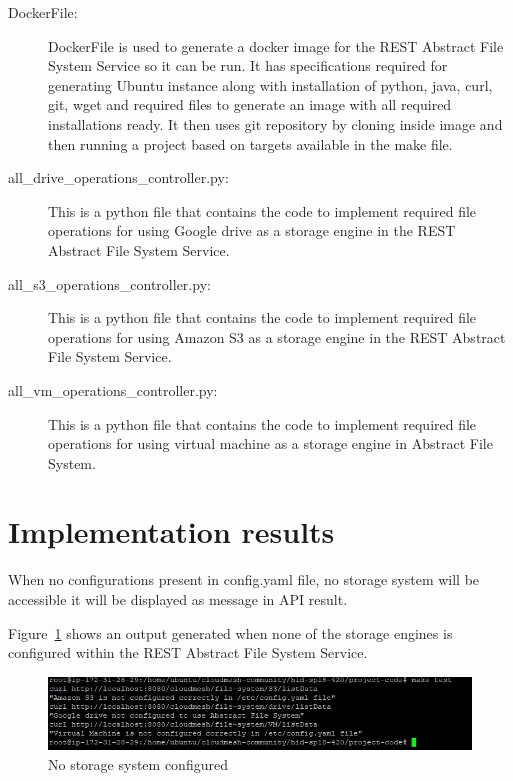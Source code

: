\begin{description}
\item[DockerFile:]


  DockerFile is used to generate a docker image for the REST Abstract
  File System Service so it can be run.  It has specifications required for
  generating Ubuntu instance along with installation of python, java,
  curl, git, wget and required files to generate an image with all
  required installations ready. It then uses git repository by cloning
  inside image and then running a project based on targets available
  in the make file.

\item[all\_drive\_operations\_controller.py:] This is a python file
  that contains the code to implement required file operations for
  using Google drive as a storage engine in the REST Abstract File
  System Service.

\item[all\_s3\_operations\_controller.py:] This is a python file that
  contains the code to implement required file operations for using
  Amazon S3 as a storage engine in the REST Abstract File System
  Service.

\item[all\_vm\_operations\_controller.py:]

This is a python file that contains the code to implement required file 
operations for using virtual machine as a storage engine in Abstract File 
System. 

\end{description}



\section{Implementation results}

When no configurations present in config.yaml file, no storage 
system will be accessible it will be displayed as message in 
API result.


Figure~\ref{fig:not-configured} shows an output generated when none of
the storage engines is configured within the REST Abstract File System
Service.


\begin{figure}[!ht]
        \centering\includegraphics[width=\columnwidth]
        {image/not-configured.JPG}
        \caption{No storage system configured}\label{fig:not-configured}
\end{figure}



